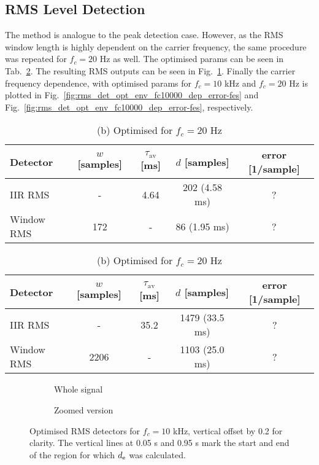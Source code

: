 \documentclass[../main2.tex]{subfiles}
\providecommand{\rootdir}{..}
\begin{document}
\subsection{RMS Level Detection}
The method is analogue to the peak detection case. However, as the RMS window length is highly dependent on the carrier frequency, the same procedure was repeated for $f_c = 20$ Hz as well. The optimised params can be seen in Tab.~\ref{tab:rms_det_opt_params}.  The resulting RMS outputs can be seen in Fig.~\ref{fig:rms_opt_10000}. Finally the carrier frequency dependence, with optimised params for $f_c=10$ kHz and $f_c=20$ Hz is plotted in Fig.~\ref{fig:rms_det_opt_env_fc10000_dep_error-fes} and Fig.~\ref{fig:rms_det_opt_env_fc10000_dep_error-fes}, respectively.
\begin{table}[h]
\begin{center}
\caption{Optimised parameters for the two RMS detectors}
\label{tab:rms_det_opt_params_10000}
\caption*{(a) Optimised for $f_c=10$ kHz}
 \begin{tabular}{| l | c c c | c |}
	\hline
	Detector & $w$ [samples] & $\tau_\text{av}$ [ms] & $d$ [samples] & error [1/sample] \\
	\hline
	IIR RMS		& -			& 4.64 	& 202 (4.58 ms)		& ?	\\ 
	Window RMS 	& 172	 		& - 	& 86	(1.95 ms)	& ?	\\ 
	\hline
\end{tabular}
\end{center}

\begin{center}
\caption*{(b) Optimised for $f_c=20$ Hz}
\label{tab:rms_det_opt_params_20}
 \begin{tabular}{| l | c c c | c |}
	\hline
	Detector & $w$ [samples] & $\tau_\text{av}$ [ms] & $d$ [samples] & error [1/sample] \\
	\hline
	IIR RMS			& - 			& 35.2 	& 1479 (33.5 ms)		& ?	\\ 
	Window RMS 	& 2206	 		& - 	& 1103 (25.0 ms)		& ?	\\ 
	\hline
\end{tabular}
\end{center}
\label{tab:rms_det_opt_params}
\end{table}
\begin{figure}[h]
\captionsetup{justification=centering}
\begin{subfigure}{\linewidth}
\centerline{}
\caption{Whole signal}
\end{subfigure}
\par\bigskip
\begin{subfigure}{\linewidth}
\centerline{}
\caption{Zoomed version}
\end{subfigure}
\caption{Optimised RMS detectors for $f_c=10$ kHz, vertical offset by 0.2 for clarity. The vertical lines at 0.05 s and 0.95 s mark the start and end of the region for which $d_\text{e}$ was calculated.}
\label{fig:rms_opt_10000}
\end{figure}
\end{document}

